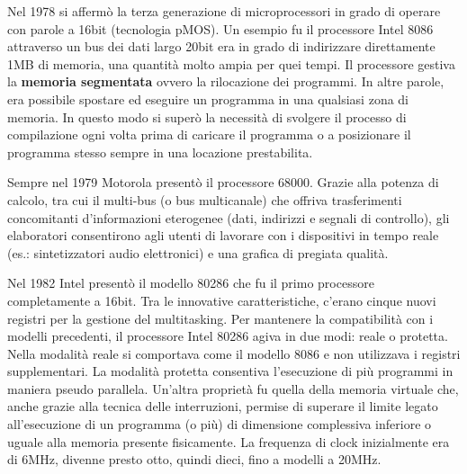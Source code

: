 \documentclass[12pt]{article} %
\begin{document}
Nel 1978 si affermò la terza generazione di microprocessori in grado di operare con parole a 16bit (tecnologia pMOS). Un esempio fu il processore Intel 8086 attraverso un bus dei dati largo 20bit era in grado di indirizzare direttamente 1MB di memoria, una quantità molto ampia per quei tempi. Il processore gestiva la \textbf{memoria segmentata} ovvero la rilocazione dei programmi. In altre parole, era possibile spostare ed eseguire un programma in una qualsiasi zona di memoria. In questo modo si superò la necessità di svolgere il processo di compilazione ogni volta prima di caricare il programma o a posizionare il programma stesso sempre in una locazione prestabilita.\par\medskip\noindent
Sempre nel 1979 Motorola presentò il processore 68000. Grazie alla potenza di calcolo, tra cui il multi-bus (o bus multicanale) che offriva trasferimenti concomitanti d’informazioni eterogenee (dati, indirizzi e segnali di controllo), gli elaboratori consentirono agli utenti di lavorare con i dispositivi in tempo reale (es.: sintetizzatori audio elettronici) e una grafica di pregiata qualità.\par\medskip\noindent
Nel 1982 Intel presentò il modello 80286 che fu il primo processore completamente a 16bit. Tra le innovative caratteristiche, c’erano cinque nuovi registri per la gestione del multitasking. Per mantenere la compatibilità con i modelli precedenti, il processore Intel 80286 agiva in due modi: reale o protetta. Nella modalità reale si comportava come il modello 8086 e non utilizzava i registri supplementari. La modalità protetta consentiva l’esecuzione di più programmi in maniera pseudo parallela. Un’altra proprietà fu quella della memoria virtuale che, anche grazie alla tecnica delle interruzioni, permise di superare il limite legato all’esecuzione di un programma (o più) di dimensione complessiva inferiore o uguale alla memoria presente fisicamente. La frequenza di clock inizialmente era di 6MHz, divenne presto otto, quindi dieci, fino a modelli a 20MHz.
\end{document}

